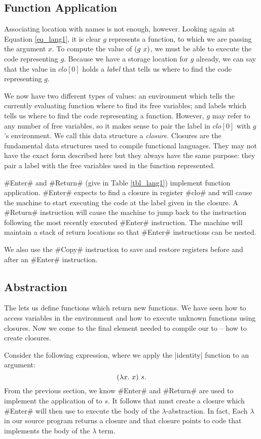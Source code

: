 \documentclass[12pt]{report}
\begin{document}
\subsection{Function Application}

Associating location with names is not enough, however. Looking again
at Equation \ref{eq_lang1}, it is clear $g$ represents a function, to
which we are passing the argument $x$. To compute the value of
$(g\ x)$, we must be able to execute the code representing
$g$. Because we have a storage location for $g$ already, we can
say that the value in $clo[0]$ holds a \emph{label} that tells us
where to find the code representing $g$. 

We now have two different types of values: an environment which tells
the currently evaluating function where to find its free variables;
and labels which tells us where to find the code representing a
function. However, $g$ may refer to any number of free variables, so
it makes sense to pair the label in $clo[0]$ with $g$'s
environment. We call this data structure a \emph{closure}. Closures
are the fundamental data structures used to compile functional
languages. They may not have the exact form described here but they
always have the same purpose: they pair a label with the free
variables used in the function represented.

#Enter# and #Return# (give in Table \ref{tbl_lang1}) implement
function application. #Enter# expects to find a closure in register
#clo# and will cause the machine to start executing the code at the
label given in the closure. A #Return# instruction will cause the
machine to jump back to the instruction following the most recently
executed #Enter# instruction. The machine will maintain a stack of
return locations so that #Enter# instructions can be nested.

We also use the #Copy# instruction to save and restore registers before
and after an #Enter# instruction. 

\subsection{Abstraction}
The \lamA lets us define functions which return new functions. We have
seen how to access variables in the environment and how to execute
unknown functions using closures. Now we come to the final element
needed to compile our \lamA to \machLam -- how to create
closures.

Consider the following expression, where we apply the |identity|
function to an argument:
\[(\lambda x.\ x)\ s.\]
From the previous section, we know #Enter# and #Return# are used to
implement the application of  to $s$. It follows that
 must create a closure which #Enter# will then use to
execute the body of the $\lambda$-abstraction. In fact, Each
$\lambda$ in our source program returns a closure and that closure
points to code that implements the body of the $\lambda$ term.
\end{document}
